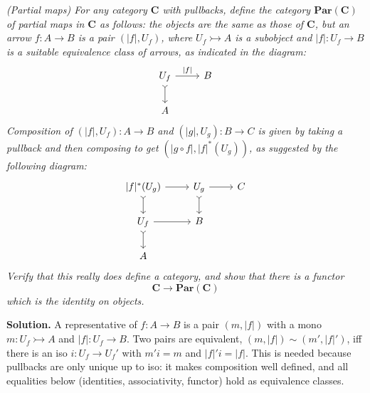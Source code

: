 \textit{(Partial maps) For any category $\mathbf{C}$ with pullbacks, define the
category $\mathbf{Par}(\mathbf{C})$ of partial maps in $\mathbf{C}$ as
follows: the objects are the same as those of $\mathbf{C}$, but an arrow $f:
A \rightarrow B$ is a pair $(|f|,U_{f})$, where $U_{f} \rightarrowtail A$ is
a subobject and $|f|: U_{f} \rightarrow B$ is a suitable equivalence class of
arrows, as indicated in the diagram:}
\[
\begin{tikzcd}
  U_{f} \ar[r, "\lvert f \rvert"] \ar[d, >->] & B \\
  A &
\end{tikzcd}
\]
\textit{Composition of $(\lvert f \rvert,U_{f}): A \rightarrow B$ and $(\lvert g
\rvert,U_{g}): B \rightarrow C$ is given by taking a pullback and then
composing to get $(\lvert g \circ f \rvert, \lvert f \rvert^{*}(U_{g}))$, as
suggested by the following diagram:}
\[
\begin{tikzcd}
  \lvert f \rvert^{*} (U_{g}) \ar[r] \ar[d, >->] & U_{g} \ar[r] \ar[d, >->] & C \\
  U_{f} \ar[r] \ar[d, >->] & B & \\
  A & &
\end{tikzcd}
\]
\textit{Verify that this really does define a category, and show that there is a
functor}
\[
  \mathbf{C} \rightarrow \mathbf{Par}(\mathbf{C})
\]
\textit{which is the identity on objects.}

\medskip
\textbf{Solution.} A representative of $f : A \to B$ is a pair $(m, |f|)$ with
a mono $m : U_f \rightarrowtail A$ and $|f| : U_f \to B$. Two pairs are
equivalent, $(m,|f|) \sim (m',|f|')$, iff there is an iso $i : U_f \to U_f'$
with $m' i = m$ and $|f|' i = |f|$. This is needed because pullbacks are only
unique up to iso: it makes composition well defined, and all equalities below
(identities, associativity, functor) hold as equivalence classes.

